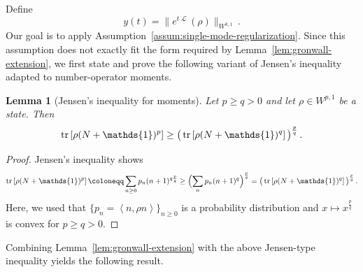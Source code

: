 \documentclass[11pt]{article}
\theoremstyle{myplain}
\newtheorem{lem}[lem]{Lemma}
\theoremstyle{mydefinition}
\theoremstyle{remark}
\DeclareMathOperator{\cL}{\mathcal{L}}
\DeclareMathOperator{\1}{\mathds{1}}
\newcommand{\braket}[1]{\left\langle #1 \right\rangle}
\newcommand{\tr}[1][]{\operatorname{tr}%
  \ifx#1\empty \else \left[ #1 \right] \fi}
\begin{document}
        Define
        \begin{equation*}
            y(t) = \| e^{t \cL}(\rho) \|_{W^{k,1}} \, .
        \end{equation*}
        Our goal is to apply Assumption~\ref{assum:single-mode-regularization}. Since this assumption does not exactly fit the form required by Lemma~\ref{lem:gronwall-extension}, we first state and prove the following variant of Jensen's inequality adapted to number-operator moments.

        \begin{lem}[Jensen's inequality for moments]\label{lem:jensens-inequality-moments-number-operator}
            Let $p \ge q > 0$ and let $\rho\in W^{p,1}$ be a state. Then
            \begin{equation}\label{eq:jensen-moment}
                \tr[\rho (N + \1)^p] \ge \big( \tr[\rho (N + \1)^q] \big)^{\frac{p}{q}} \, .
            \end{equation}
        \end{lem}

        \begin{proof}
            Jensen's inequality shows
            \begin{equation*}
                \tr[\rho (N + \1)^p] \coloneqq \sum_{n\geq0} p_n (n + 1)^{q \frac{p}{q}}\geq\Bigl( \sum_{n} p_n (n + 1)^{q} \Bigr)^{\frac{p}{q}}=\big( \tr[\rho (N + \1)^q] \big)^{\frac{p}{q}} \, .
            \end{equation*}
            Here, we used that $\{p_n = \braket{n, \rho n}\}_{n\geq0}$ is a probability distribution and $x \mapsto x^{\frac{p}{q}}$ is convex for $p \ge q > 0$.
        \end{proof}

        Combining Lemma~\ref{lem:gronwall-extension} with the above Jensen-type inequality yields the following result.
\end{document}
